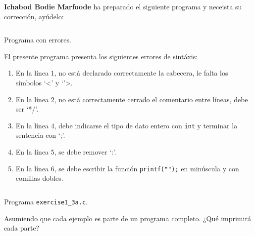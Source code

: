 \documentclass[spanish,addpoints,answers,a4paper]{exam}
\begin{document}
\begin{questions}
\question \textbf{Ichabod Bodie Marfoode} ha preparado el siguiente programa y neceista su corrección, ayúdelo:

\begin{listing}[H]
\footnotesize
\inputminted[linenos]{c}{exercise1_3.c}
\caption{Programa con errores.}
\label{lst:3}
\end{listing}

\begin{solution}
El presente programa presenta los siguientes errores de sintáxis:

\begin{enumerate}[$\bullet$]
\item En la línea $1$, no está declarado correctamente la cabecera, le falta los símbolos `<' y `'>.

\item En la línea $2$, no está correctamente cerrado el comentario entre líneas, debe ser `*/'.

\item En la línea $4$, debe indicarse el tipo de dato entero con \texttt{int} y terminar la sentencia con `;'.

\item En la línea $5$, se debe remover `:'.

\item En la línea $6$, se debe escribir la función \texttt{printf("");} en minúscula y con comillas dobles.

\end{enumerate}

\begin{listing}[H]
\footnotesize
\inputminted{c}{exercise1_3a.c}
\caption{Programa \texttt{exercise1\_3a.c}.}
\label{lst:3a}
\end{listing}

\end{solution}

\question Asumiendo que cada ejemplo es parte de un programa completo. ¿Qué imprimirá cada parte?

\end{questions}
\end{document}
